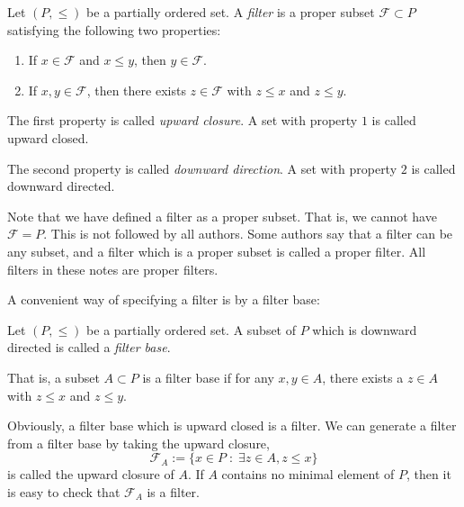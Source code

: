 \begin{definition}
    Let $(P,\leq)$ be a partially ordered set. A \emph{filter} is a
    proper subset $\mathcal{F} \subset P$
    satisfying the following two properties:
    \begin{enumerate}
        \item{} If $x \in \mathcal{F}$ and $x \leq y$, then $y \in \mathcal{F}$.
        \item{} If $x,y \in \mathcal{F}$, then there exists $z \in \mathcal{F}$
        with $z \leq x$ and $z \leq y$.
    \end{enumerate}
    The first property is called \emph{upward closure}. A set with property
    $1$ is called upward closed. 

    The second property is called \emph{downward direction}. A set
    with property $2$ is called downward directed.
\end{definition}
Note that we have defined a filter as a proper subset. That is, we
cannot have $\mathcal{F} = P$. This is not followed by all authors. Some
authors say that a filter can be any subset, and a filter which is a proper
subset is called a proper filter. All filters in these 
notes are proper filters.

A convenient way of specifying a filter is by a filter base:
\begin{definition}
    Let $(P,\leq)$ be a partially ordered set. A subset of $P$
    which is downward directed is called a \emph{filter base}.

    That is, a subset $A \subset P$ is a filter base if for any $x,y \in A$, 
    there exists a $z \in A$ with $z \leq x$ and $z \leq y$.

    Obviously, a filter base which is upward closed is a filter. We can generate
    a filter from a filter base by taking the upward closure,
    \begin{equation*}
        \mathcal{F}_A := \{ x \in P\;:\;\exists z \in A, z \leq x\}
    \end{equation*}
    is called the upward closure of $A$. If $A$ contains
    no minimal element of $P$, then it is easy to check that $\mathcal{F}_A$
    is a filter.
\end{definition}

